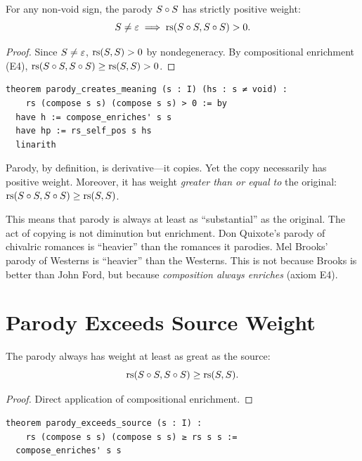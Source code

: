 \begin{theorem}
\label{thm:parody-creates}
For any non-void sign, the parody $S \circ S$ has strictly positive
weight:
\[
  S \neq \varepsilon \implies \mathrm{rs}(S \circ S, S \circ S) > 0.
\]
\end{theorem}

\begin{proof}
Since $S \neq \varepsilon$, $\mathrm{rs}(S, S) > 0$ by nondegeneracy.
By compositional enrichment (E4),
$\mathrm{rs}(S \circ S, S \circ S) \geq \mathrm{rs}(S, S) > 0$.
\end{proof}

\begin{lstlisting}
theorem parody_creates_meaning (s : I) (hs : s ≠ void) :
    rs (compose s s) (compose s s) > 0 := by
  have h := compose_enriches' s s
  have hp := rs_self_pos s hs
  linarith
\end{lstlisting}

\begin{remark}
Parody, by definition, is derivative---it copies.  Yet the copy
necessarily has positive weight.  Moreover, it has weight
\emph{greater than or equal to} the original:
$\mathrm{rs}(S \circ S, S \circ S) \geq \mathrm{rs}(S, S)$.

This means that parody is always at least as ``substantial'' as the
original.  The act of copying is not diminution but enrichment.  Don
Quixote's parody of chivalric romances is ``heavier'' than the romances
it parodies.  Mel Brooks' parody of Westerns is ``heavier'' than the
Westerns.  This is not because Brooks is better than John Ford, but
because \emph{composition always enriches} (axiom E4).
\end{remark}

\section{Parody Exceeds Source Weight}

\begin{theorem}
\label{thm:parody-exceeds}
The parody always has weight at least as great as the source:
\[
  \mathrm{rs}(S \circ S, S \circ S) \geq \mathrm{rs}(S, S).
\]
\end{theorem}

\begin{proof}
Direct application of compositional enrichment.
\end{proof}

\begin{lstlisting}
theorem parody_exceeds_source (s : I) :
    rs (compose s s) (compose s s) ≥ rs s s :=
  compose_enriches' s s
\end{lstlisting}

